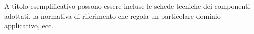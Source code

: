 \documentclass[12pt]{article}
\begin{document}
A titolo esemplificativo possono essere incluse le schede tecniche dei componenti adottati, la normativa di riferimento che regola un particolare dominio applicativo, ecc.


\newpage






\end{document}
